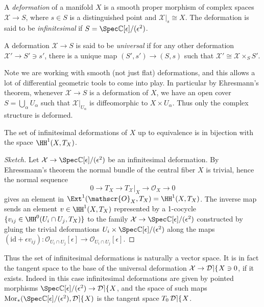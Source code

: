\begin{definition}
    A \textit{deformation} of a manifold \(X\) is a smooth proper morphism of
    complex spaces \(\mathcal{X}\to S\), where \(s\in S\) is a distinguished
    point and \(\mathcal{X}|_s\cong X\). The deformation is said to be
    \textit{infinitesimal} if \(S=\Spec \mathbb{C}[\epsilon]/(\epsilon^2)\).

    A deformation \(\mathcal{X}\to S\) is said to be \textit{universal} if for
    any other deformation \(\mathcal{X}'\to S'\ni s'\), there is a unique map
    \((S',s')\to (S,s)\) such that \(\mathcal{X}'\cong \mathcal{X}\times_S
    S'\).
\end{definition}

\begin{remark}
    Note we are working with smooth (not just flat) deformations, and this
    allows a lot of differential geometric tools to come into play. In
    particular by Ehresmann's theorem, whenever \(\mathcal{X}\to S\) is a
    deformation of \(X\), we have an open cover \(S=\bigcup_\alpha U_\alpha\)
    such that \(\mathcal{X}|_{U_\alpha}\) is diffeomorphic to \(X\times
    U_\alpha\). Thus only the complex structure is deformed.
\end{remark}

\begin{theorem}
    The set of infinitesimal deformations of \(X\) up to equivalence is in
    bijection with the space \(\HH^1(X,T_X)\).

    \begin{proof}[Sketch]
        Let \(\mathcal{X}\to \Spec \mathbb{C}[\epsilon]/(\epsilon^2)\) be an
        infinitesimal deformation. By Ehressmann's theorem the normal bundle of
        the central fiber \(X\) is trivial, hence the normal sequence \[0\to
        T_X\to T_{\mathcal{X}}|_X\to \mathscr{O}_X\to 0\] gives an element in
        \(\Ext^1(\mathscr{O}_X, T_X)=\HH^1(X,T_X)\). The inverse map sends an
        element \(v\in \HH^1(X,T_X)\) represented by a 1-cocycle \(\{v_{ij}\in
        \HH^0(U_i\cap U_j, T_X)\}\) to the family \(\mathcal{X}\to
        \Spec\mathbb{C}[\epsilon]/(\epsilon^2)\) constructed by gluing the
        trivial deformations \(U_i\times \Spec
        \mathbb{C}[\epsilon]/(\epsilon^2)\) along the maps \((\text{id}+\epsilon
        v_{ij}):\mathscr{O}_{U_i\cap U_j}[\epsilon]\to\mathscr{O}_{U_i\cap
        U_j}[\epsilon]\).
    \end{proof}
\end{theorem}

Thus the set of infinitesimal deformations is naturally a vector space. It is in
fact the tangent space to the base of the universal deformation \(\mathcal{X}\to
\mathop{\mathcal{D\kern -0.5pt e\kern -0.5pt f\kern -1pt}} X\ni 0\), if it exists. Indeed in this case infinitesimal deformations are
given by pointed morphisms \(\Spec \mathbb{C}[\epsilon]/(\epsilon^2)\to \Def
X\), and the space of such maps \(\text{Mor}_\ast(\Spec
\mathbb{C}[\epsilon]/(\epsilon^2), \Def X)\) is the tangent space \(T_0\mathop{\mathcal{D\kern -0.5pt e\kern -0.5pt f\kern -1pt}}
X\).

